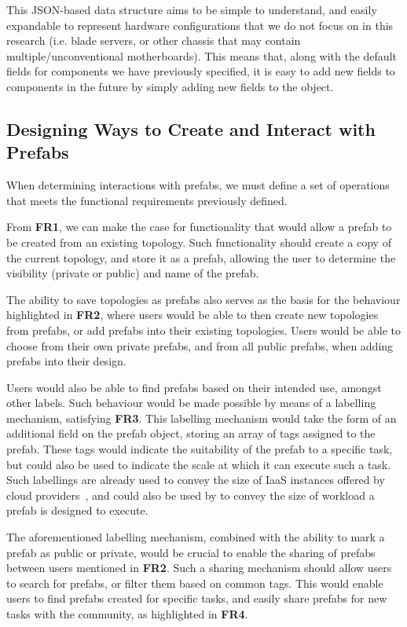 \documentclass[11pt]{article}
\begin{document}
		This JSON-based data structure aims to be simple to understand, and easily expandable to represent hardware configurations that we do not focus on in this research (i.e. blade servers, or other chassis that may contain multiple/unconventional motherboards).
		This means that, along with the default fields for components we have previously specified, it is easy to add new fields to components in the future by simply adding new fields to the object.


	\subsection{Designing Ways to Create and Interact with Prefabs}
		When determining interactions with prefabs, we must define a set of operations that meets the functional requirements previously defined.
		
		From \textbf{FR1}, we can make the case for functionality that would allow a prefab to be created from an existing topology.
		Such functionality should create a copy of the current topology, and store it as a prefab, allowing the user to determine the visibility (private or public) and name of the prefab.

		The ability to save topologies as prefabs also serves as the basis for the behaviour highlighted in \textbf{FR2}, where users would be able to then create new topologies from prefabs, or add prefabs into their existing topologies.
		Users would be able to choose from their own private prefabs, and from all public prefabs, when adding prefabs into their design.

		Users would also be able to find prefabs based on their intended use, amongst other labels. 
		Such behaviour would be made possible by means of a labelling mechanism, satisfying \textbf{FR3}.
		This labelling mechanism would take the form of an additional field on the prefab object, storing an array of tags assigned to the prefab.
		These tags would indicate the suitability of the prefab to a specific task, but could also be used to indicate the scale at which it can execute such a task.
		Such labellings are already used to convey the size of IaaS instances offered by cloud providers~\cite{davatz2017}, and could also be used by \opendc{} to convey the size of workload a prefab is designed to execute.

		The aforementioned labelling mechanism, combined with the ability to mark a prefab as public or private, would be crucial to enable the sharing of prefabs between users mentioned in \textbf{FR2}.
		Such a sharing mechanism should allow users to search for prefabs, or filter them based on common tags.
		This would enable users to find prefabs created for specific tasks, and easily share prefabs for new tasks with the community, as highlighted in \textbf{FR4}.
\end{document}
